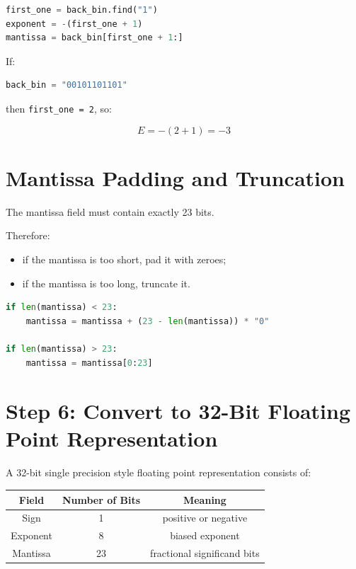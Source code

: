 \documentclass[11pt]{article}
\begin{document}
\begin{lstlisting}[language=Python]
first_one = back_bin.find("1")
exponent = -(first_one + 1)
mantissa = back_bin[first_one + 1:]
\end{lstlisting}

If:

\begin{lstlisting}[language=Python]
back_bin = "00101101101"
\end{lstlisting}

then \texttt{first\_one = 2}, so:

\[
E = -(2 + 1) = -3
\]

\section{Mantissa Padding and Truncation}

The mantissa field must contain exactly 23 bits.

Therefore:

\begin{itemize}
    \item if the mantissa is too short, pad it with zeroes;
    \item if the mantissa is too long, truncate it.
\end{itemize}

\begin{lstlisting}[language=Python]
if len(mantissa) < 23:
    mantissa = mantissa + (23 - len(mantissa)) * "0"

if len(mantissa) > 23:
    mantissa = mantissa[0:23]
\end{lstlisting}

\section{Step 6: Convert to 32-Bit Floating Point Representation}

A 32-bit single precision style floating point representation consists of:

\begin{center}
\begin{tabular}{ccc}
\toprule
Field & Number of Bits & Meaning \\
\midrule
Sign & 1 & positive or negative \\
Exponent & 8 & biased exponent \\
Mantissa & 23 & fractional significand bits \\
\bottomrule
\end{tabular}
\end{center}
\end{document}

